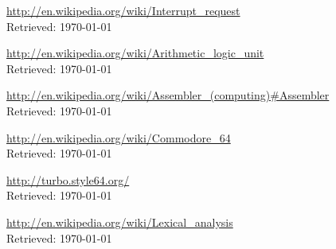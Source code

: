 \documentclass{article}
\begin{document}
\begin{thebibliography}{}
{\url{http://en.wikipedia.org/wiki/Interrupt_request}\\
Retrieved: \today}

{\url{http://en.wikipedia.org/wiki/Arithmetic_logic_unit}\\
Retrieved: \today}

{\url{http://en.wikipedia.org/wiki/Assembler_(computing)#Assembler}\\
Retrieved: \today}

{\url{http://en.wikipedia.org/wiki/Commodore_64}\\
Retrieved: \today}

{\url{http://turbo.style64.org/}\\
Retrieved: \today}

{\url{http://en.wikipedia.org/wiki/Lexical_analysis}\\
Retrieved: \today}

\end{thebibliography}
\end{document}
